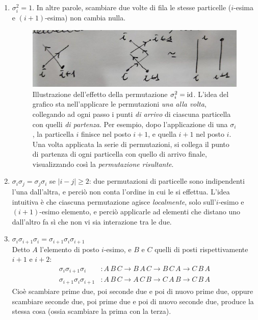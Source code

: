 \documentclass[../../FisicaTeorica.tex]{subfiles}
\begin{document}
\begin{enumerate}
\item $\sigma_i^2 = 1$. In altre parole, scambiare due volte di fila le stesse particelle ($i$-esima e $(i+1)$-esima) non cambia nulla.
\begin{figure}[H]
\centering
\includegraphics[scale=0.5]{Immagini/12_12/image003.jpg}
\caption{Illustrazione dell'effetto della permutazione $\sigma_i^2 = \operatorname{id}$. L'idea del grafico sta nell'applicare le permutazioni \textit{una alla volta}, collegando ad ogni passo i punti \textit{di arrivo} di ciascuna particella con quelli \textit{di partenza}. Per esempio, dopo l'applicazione di una $\sigma_i$, la particella $i$ finisce nel posto $i+1$, e quella $i+1$ nel posto $i$. Una volta applicata la serie di permutazioni, si collega il punto di partenza di ogni particella con quello di arrivo finale, visualizzando così la \textit{permutazione risultante}.}
\end{figure}
\item $\sigma_i \sigma_j = \sigma_j \sigma_i$ se $|i-j|\geq 2$: due permutazioni di particelle  sono indipendenti l'una dall'altra, e perciò non conta l'ordine in cui le si effettua. L'idea intuitiva è che ciascuna permutazione agisce \textit{localmente}, solo sull'$i$-esimo e $(i+1)$-esimo elemento, e perciò applicarle ad elementi che distano  uno dall'altro fa sì che non vi sia interazione tra le due.
\item $\sigma_i \sigma_{i+1}\sigma_i = \sigma_{i+1}\sigma_i\sigma_{i+1}$\\ %
Detto $A$ l'elemento di posto $i$-esimo, e $B$ e $C$ quelli di posti rispettivamente $i+1$ e $i+2$:
\begin{align*}
\sigma_i \sigma_{i+1}\sigma_i&:A\,B\,C\to B\,A\,C \to B\,C\,A \to C\,B\,A\\
\sigma_{i+1}\sigma_i \sigma_{i+1}&:
A\,B\,C \to A\,C\,B\to C\,A\,B \to C\,B\,A 
\end{align*}
Cioè scambiare prime due, poi seconde due e poi di nuovo prime due, oppure scambiare seconde due, poi prime due e poi di nuovo seconde due, produce la stessa cosa (ossia scambiare la prima con la terza).

\end{enumerate}
\end{document}
